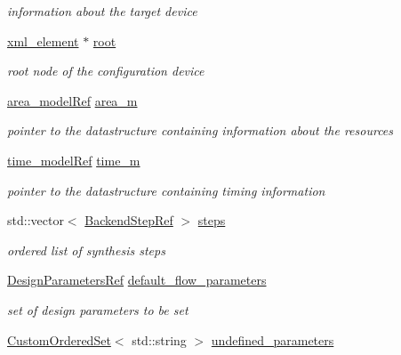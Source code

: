 \begin{DoxyCompactItemize}
\begin{DoxyCompactList}\small\item\em information about the target device \end{DoxyCompactList}\item 
\hyperlink{classxml__element}{xml\+\_\+element} $\ast$ \hyperlink{classBackendFlow_aab524f20d7d689fd52c38402c06b0f91}{root}
\begin{DoxyCompactList}\small\item\em root node of the configuration device \end{DoxyCompactList}\item 
\hyperlink{area__model_8hpp_aec11e4e9b1b3afd49a437cb37df0abfb}{area\+\_\+model\+Ref} \hyperlink{classBackendFlow_a09fc230d74618daa0c27bba53989985b}{area\+\_\+m}
\begin{DoxyCompactList}\small\item\em pointer to the datastructure containing information about the resources \end{DoxyCompactList}\item 
\hyperlink{time__model_8hpp_ae203bb7faf1c278333f76fcc6ebe412c}{time\+\_\+model\+Ref} \hyperlink{classBackendFlow_a9c4448096051a3bdbb829759234024d3}{time\+\_\+m}
\begin{DoxyCompactList}\small\item\em pointer to the datastructure containing timing information \end{DoxyCompactList}\item 
std\+::vector$<$ \hyperlink{BackendFlow_8hpp_ab49214bb532f4d4cce15fd2e89eff5d7}{Backend\+Step\+Ref} $>$ \hyperlink{classBackendFlow_a8e2f17698c827b202321df499b46eba8}{steps}
\begin{DoxyCompactList}\small\item\em ordered list of synthesis steps \end{DoxyCompactList}\item 
\hyperlink{DesignParameters_8hpp_ae36bb1c4c9150d0eeecfe1f96f42d157}{Design\+Parameters\+Ref} \hyperlink{classBackendFlow_a2df124049b3346831ca2b60040a923d6}{default\+\_\+flow\+\_\+parameters}
\begin{DoxyCompactList}\small\item\em set of design parameters to be set \end{DoxyCompactList}\item 
\hyperlink{classCustomOrderedSet}{Custom\+Ordered\+Set}$<$ std\+::string $>$ \hyperlink{classBackendFlow_a874c2f1cf929d2ab0cf742aceff21a9d}{undefined\+\_\+parameters}

\end{DoxyCompactItemize}
